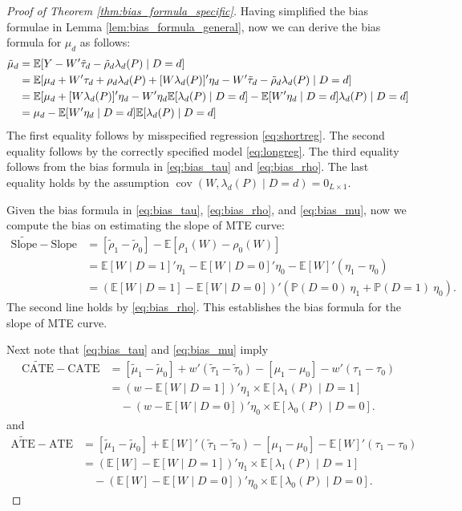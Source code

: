 \documentclass[11pt]{article}
\theoremstyle{definition}
\DeclareMathOperator{\cov}{cov}
\newcommand{\Exp}{\ensuremath{\mathbb{E}}} %
\newcommand{\Prob}{\ensuremath{\mathbb{P}}} %
\newcommand{\0}{\ensuremath{\mathbf{0}}}
\begin{document}
\begin{bibunit}
\begin{proof}[Proof of Theorem \ref{thm:bias_formula_specific}]
Having simplified the bias formulae in Lemma \ref{lem:bias_formula_general}, now we can derive the bias formula for $\mu_d$ as follows:
\begin{align}
    \tilde{\mu}_d
    &= \Exp[Y - W'\tilde{\tau}_d - \tilde{\rho}_d\lambda_d(P)\mid D=d] \notag \\
    &= \Exp[\mu_d + W'\tau_d + \rho_d\lambda_d(P) + [W\lambda_d(P)]'\eta_d - W'\tilde{\tau}_d - \tilde{\rho}_d\lambda_d(P)\mid D=d] \notag \\
    &=\Exp[\mu_d + [W\lambda_d(P)]'\eta_d - W'\eta_d \Exp[\lambda_d(P)\mid D=d] - \Exp[W'\eta_d\mid D=d]\lambda_d(P)\mid D=d] \notag \\
    &= \mu_d - \Exp[W'\eta_d\mid D=d]\Exp[\lambda_d(P)\mid D=d] \label{eq:bias_mu}
\end{align}
The first equality follows by misspecified regression \eqref{eq:shortreg}. The second equality follows by the correctly specified model \eqref{eq:longreg}. The third equality follows from the bias formula in \eqref{eq:bias_tau} and \eqref{eq:bias_rho}. The last equality holds by the assumption $\cov(W,\lambda_d(P)\mid D=d) = 0_{L\times 1}$.

Given the bias formula in \eqref{eq:bias_tau}, \eqref{eq:bias_rho}, and  \eqref{eq:bias_mu}, now we compute the bias on estimating the slope of MTE curve:
\begin{align*}
    \widetilde{\text{Slope}} - \text{Slope}
    &= [\tilde{\rho}_1 - \tilde{\rho}_0] - \Exp[\rho_1(W) -\rho_0(W)]\\
    &= \Exp[W\mid D=1]'\eta_1 - \Exp[W\mid D=0]'\eta_0 - \Exp[W]'(\eta_1 - \eta_0) \\
    &= \left(\Exp[W\mid D=1] - \Exp[W\mid D=0]\right)'(\Prob(D=0) ~ \eta_1 + \Prob(D=1) ~ \eta_0).
\end{align*}
The second line holds by \eqref{eq:bias_rho}. This establishes the bias formula for the slope of MTE curve.

Next note that \eqref{eq:bias_tau} and \eqref{eq:bias_mu} imply
\begin{align*}
    \widetilde{\text{CATE}} - \text{CATE}
    &= [\tilde{\mu}_1 - \tilde{\mu}_0] + w'(\tilde{\tau}_1 - \tilde{\tau}_0) - [\mu_1 - \mu_0] - w'(\tau_1 - \tau_0) \\
    &= (w - \Exp[W\mid D=1])'\eta_1\times \Exp[\lambda_1(P)\mid D=1] \\
    & \quad - (w - \Exp[W\mid D=0])'\eta_0 \times \Exp[\lambda_0(P)\mid D=0].
\end{align*}
and 
\begin{align*}
    \widetilde{\text{ATE}} - \text{ATE}
    &= [\tilde{\mu}_1 - \tilde{\mu}_0] + \Exp[W]'(\tilde{\tau}_1 - \tilde{\tau}_0) - [\mu_1 - \mu_0] - \Exp[W]'(\tau_1 - \tau_0) \\
    &= (\Exp[W] - \Exp[W\mid D=1])'\eta_1\times \Exp[\lambda_1(P)\mid D=1] \\
    & \quad - (\Exp[W] - \Exp[W\mid D=0])'\eta_0 \times \Exp[\lambda_0(P)\mid D=0].
\end{align*}


\end{proof}
\end{bibunit}
\end{document}
